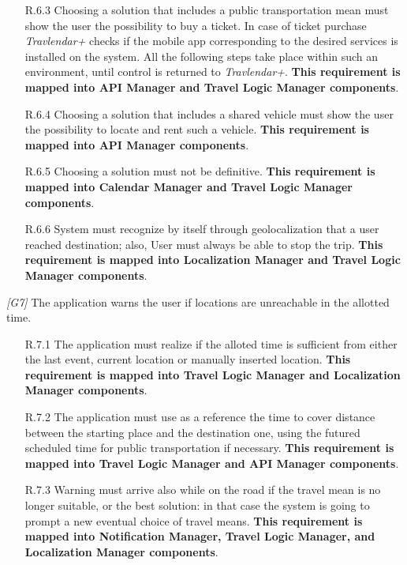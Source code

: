 \begin{description}
\begin{itemize}
			\item [R.6.3] Choosing a solution that includes a public transportation mean must show the user the possibility to buy a ticket. In case of ticket purchase \textit{Travlendar+} checks if the mobile app corresponding to the desired services is installed on the system. All the following steps take place within such an environment, until control is returned to \textit{Travlendar+}.
			\textbf{This requirement is mapped into API Manager and Travel Logic Manager components}.

			\item [R.6.4] Choosing a solution that includes a shared vehicle must show the user the possibility to locate and rent such a vehicle.
			\textbf{This requirement is mapped into API Manager components}.

			\item [R.6.5] Choosing a solution must not be definitive.
			\textbf{This requirement is mapped into Calendar Manager and Travel Logic Manager components}.

			\item [R.6.6] System must recognize by itself through geolocalization that a user reached destination; also, User must always be able to stop the trip.
			\textbf{This requirement is mapped into Localization Manager and Travel Logic Manager components}.
		\end{itemize}


	\item \textit{[G7]} The application warns the user if locations are unreachable in the allotted time.
		\begin{itemize}
			\item[R.7.1] The application must realize if the alloted time is sufficient from either the last event, current location or manually inserted location.
			\textbf{This requirement is mapped into Travel Logic Manager and Localization Manager components}.

			\item[R.7.2] The application must use as a reference the time to cover distance between the starting place and the destination one, using the futured scheduled time for public transportation if necessary.
			\textbf{This requirement is mapped into Travel Logic Manager and API Manager components}.

			\item [R.7.3] Warning must arrive also while on the road if the travel mean is no longer suitable, or the best solution: in that case the system is going to prompt a new eventual choice of travel means.
			\textbf{This requirement is mapped into Notification Manager, Travel Logic Manager, and Localization Manager components}.


\end{itemize}
\end{description}
